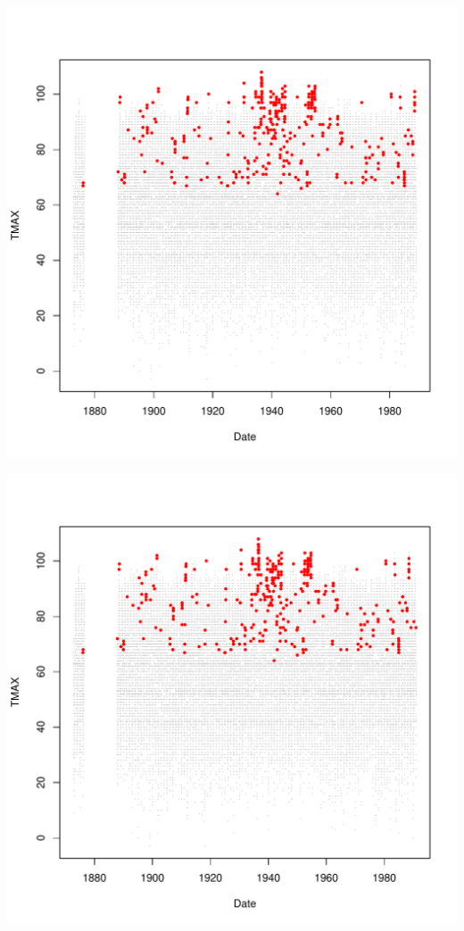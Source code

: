 \documentclass{article}\usepackage[]{graphicx}\usepackage[]{color}
\makeatletter
\def\maxwidth{ %
  \ifdim\Gin@nat@width>\linewidth
    \linewidth
  \else
    \Gin@nat@width
  \fi
}
\newenvironment{knitrout}{}{} %
\makeatother
\begin{document}
\begin{knitrout}
\includegraphics[width=\maxwidth]{figure/unnamed-chunk-4-54} 

\includegraphics[width=\maxwidth]{figure/unnamed-chunk-4-55} 


\end{knitrout}
\end{document}
